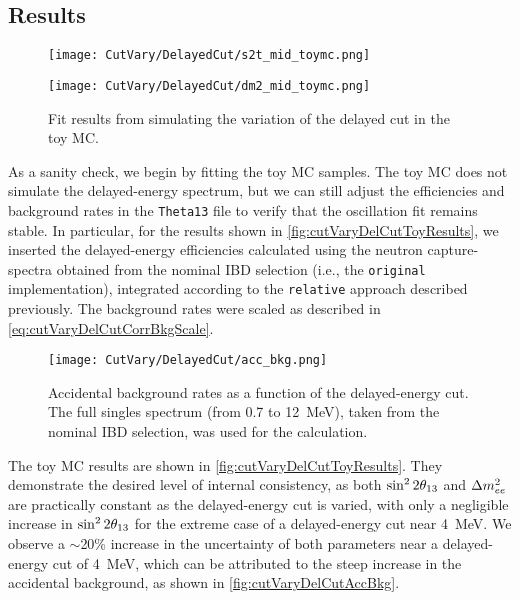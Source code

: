 \documentclass[../thesis.tex]{subfiles}
\begin{document}
\subsection{Results}
\label{sec:cutVaryDelCutResults}

\begin{figure}[ht]
  \begin{minipage}{0.5\linewidth}%
    \texttt{[image: CutVary/DelayedCut/s2t\_mid\_toymc.png]}%
  \end{minipage}%
  \begin{minipage}{0.5\linewidth}%
    \texttt{[image: CutVary/DelayedCut/dm2\_mid\_toymc.png]}%
  \end{minipage}%
  \caption{Fit results from simulating the variation of the delayed cut in the toy MC.}
  \label{fig:cutVaryDelCutToyResults}
\end{figure}

As a sanity check, we begin by fitting the toy MC samples. The toy MC does not simulate the delayed-energy spectrum, but we can still adjust the efficiencies and background rates in the \texttt{Theta13} file to verify that the oscillation fit remains stable. In particular, for the results shown in \autoref{fig:cutVaryDelCutToyResults}, we inserted the delayed-energy efficiencies calculated using the neutron capture-spectra obtained from the nominal IBD selection (i.e., the \texttt{original} implementation), integrated according to the \texttt{relative} approach described previously.
The background rates were scaled as described in \autoref{eq:cutVaryDelCutCorrBkgScale}.

\begin{figure}[ht]
  \texttt{[image: CutVary/DelayedCut/acc\_bkg.png]}
  \caption{Accidental background rates as a function of the delayed-energy cut. The full singles spectrum (from 0.7 to 12~MeV), taken from the nominal IBD selection, was used for the calculation.}
  \label{fig:cutVaryDelCutAccBkg}
\end{figure}

The toy MC results are shown in \autoref{fig:cutVaryDelCutToyResults}. They demonstrate the desired level of internal consistency, as both $\sin^2 2\theta_{13}$ and $\Delta m^2_{ee}$ are practically constant as the delayed-energy cut is varied, with only a negligible increase in $\sin^2 2\theta_{13}$ for the extreme case of a delayed-energy cut near 4~MeV. We observe a $\sim$20\% increase in the uncertainty of both parameters near a delayed-energy cut of 4~MeV, which can be attributed to the steep increase in the accidental background, as shown in \autoref{fig:cutVaryDelCutAccBkg}.
\end{document}

